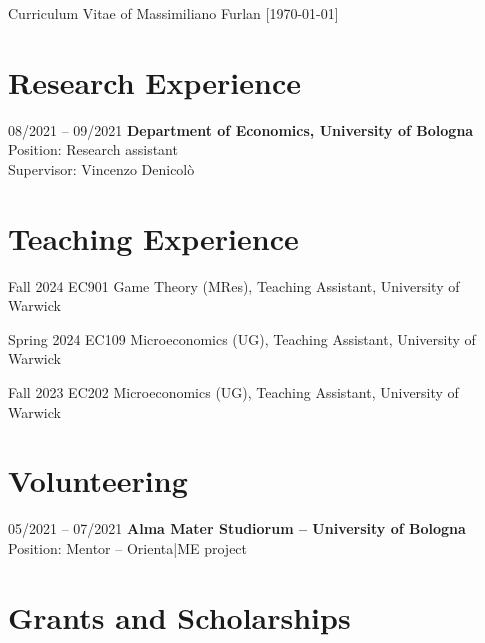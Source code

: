 \documentclass[11pt,a4paper]{article}
\begin{document}
\begin{cv}{\LARGE Curriculum Vitae of Massimiliano Furlan \large{[\mydatestyle\today]}}
\section{Research Experience}

\begin{cvlist}{}
	\item[08/2021 -- 09/2021] \textbf{Department of Economics, University of Bologna}\\
		Position: Research assistant\\
		Supervisor: Vincenzo Denicolò
\end{cvlist}
\vspace{-20pt}

\section{Teaching Experience}

\begin{cvlist}{}
  	\itemsep -4pt
	\item[Fall 2024] EC901 Game Theory (MRes), Teaching Assistant, University of Warwick
	\item[Spring 2024] EC109 Microeconomics (UG), Teaching Assistant, University of Warwick
	\item[Fall 2023] EC202 Microeconomics (UG), Teaching Assistant, University of Warwick
	\end{cvlist}
\vspace{-20pt}

\section{Volunteering}
\begin{cvlist}{}
	\item[05/2021 -- 07/2021] \textbf{Alma Mater Studiorum – University of Bologna}\\
		Position: Mentor -- Orienta|ME project
\end{cvlist}
\vspace{-20pt}

\section{Grants and Scholarships}
\begin{cvlist}{}
	\itemsep -4pt
	

\end{cvlist}
\end{cv}
\end{document}

